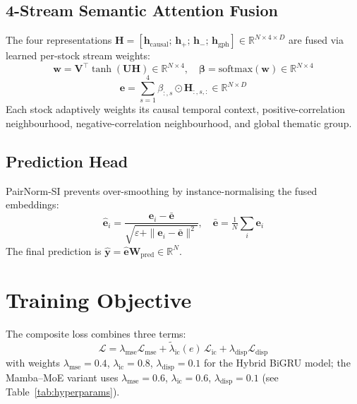 \documentclass[a4paper,11pt]{report}
\begin{document}
\subsection{4-Stream Semantic Attention Fusion}

The four representations $\mathbf{H} = [\mathbf{h}_{\text{causal}};\,\mathbf{h}_{+};\,\mathbf{h}_{-};\,\mathbf{h}_{\text{gph}}] \in \mathbb{R}^{N \times 4 \times D}$ are fused via learned per-stock stream weights:
\begin{equation}
\mathbf{w} = \mathbf{V}^{\top}\tanh(\mathbf{U}\mathbf{H}) \in \mathbb{R}^{N \times 4}, \quad
\boldsymbol{\beta} = \text{softmax}(\mathbf{w}) \in \mathbb{R}^{N \times 4}
\end{equation}
\begin{equation}
\mathbf{e} = \sum_{s=1}^{4}\beta_{:,s}\odot\mathbf{H}_{:,s,:} \in \mathbb{R}^{N \times D}
\end{equation}
Each stock adaptively weights its causal temporal context, positive-correlation neighbourhood, negative-correlation neighbourhood, and global thematic group.

\subsection{Prediction Head}

PairNorm-SI prevents over-smoothing by instance-normalising the fused embeddings:
\begin{equation}
\hat{\mathbf{e}}_i = \frac{\mathbf{e}_i - \bar{\mathbf{e}}}{\sqrt{\varepsilon + \|\mathbf{e}_i - \bar{\mathbf{e}}\|^2}}, \quad \bar{\mathbf{e}} = \tfrac{1}{N}\textstyle\sum_i\mathbf{e}_i
\end{equation}
The final prediction is $\hat{\mathbf{y}} = \hat{\mathbf{e}}\mathbf{W}_{\text{pred}} \in \mathbb{R}^N$.

\section{Training Objective}
\label{sec:training}

The composite loss combines three terms:
\begin{equation}
\mathcal{L} = \lambda_{\text{mse}}\mathcal{L}_{\text{mse}} + \tilde{\lambda}_{\text{ic}}(e)\,\mathcal{L}_{\text{ic}} + \lambda_{\text{disp}}\mathcal{L}_{\text{disp}}
\end{equation}
with weights $\lambda_{\text{mse}}=0.4$, $\lambda_{\text{ic}}=0.8$, $\lambda_{\text{disp}}=0.1$ for the Hybrid BiGRU model; the Mamba--MoE variant uses $\lambda_{\text{mse}}=0.6$, $\lambda_{\text{ic}}=0.6$, $\lambda_{\text{disp}}=0.1$ (see Table~\ref{tab:hyperparams}).
\end{document}

